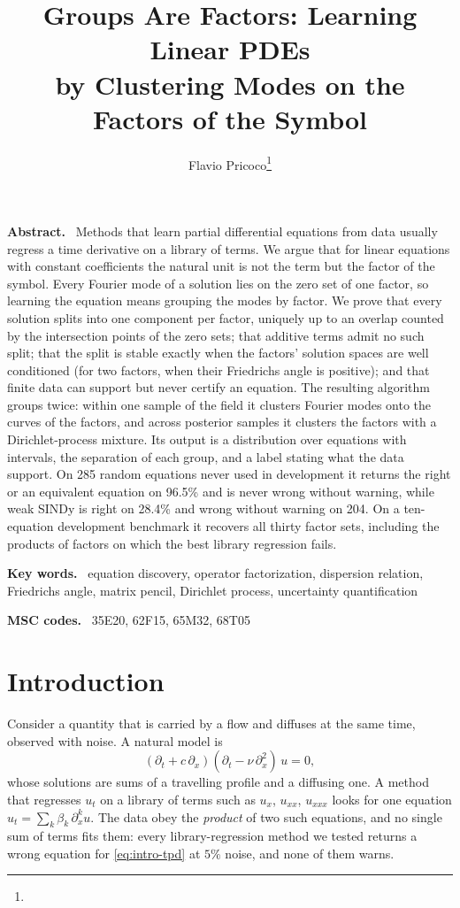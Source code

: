 \documentclass[11pt]{article}
\title{Groups Are Factors: Learning Linear PDEs\\by Clustering Modes on the Factors of the Symbol}
\author{Flavio Pricoco\thanks{\email{flaflapr@gmail.com}}}
\newenvironment{keywords}{\par\smallskip\noindent\textbf{Key words.}\ }{\par}
\newenvironment{MSCcodes}{\par\smallskip\noindent\textbf{MSC codes.}\ }{\par}
\renewenvironment{abstract}{\par\small\noindent\textbf{Abstract.}\ }{\par\normalsize}
\theoremstyle{plain}
\theoremstyle{definition}
\theoremstyle{remark}
\begin{document}
\maketitle

\begin{abstract}
Methods that learn partial differential equations from data usually regress a time derivative on a library of terms.
We argue that for linear equations with constant coefficients the natural unit is not the term but the factor of the
symbol. Every Fourier mode of a solution lies on the zero set of one factor, so learning the equation means grouping
the modes by factor. We prove that every solution splits into one component per factor, uniquely up to an overlap
counted by the intersection points of the zero sets; that additive terms admit no such split; that the split is stable
exactly when the factors' solution spaces are well conditioned (for two factors, when their Friedrichs angle is
positive); and that finite data can support but never certify an equation. The resulting algorithm groups twice:
within one sample of the field it clusters Fourier modes onto the curves of the factors, and across posterior samples
it clusters the factors with a Dirichlet-process mixture. Its output is a distribution over equations with intervals,
the separation of each group, and a label stating what the data support. On 285 random equations never used in
development it returns the right or an equivalent equation on 96.5\% and is never wrong without warning, while weak
SINDy is right on 28.4\% and wrong without warning on 204. On a ten-equation development benchmark it recovers all
thirty factor sets, including the products of factors on which the best library regression fails.
\end{abstract}

\begin{keywords}
equation discovery, operator factorization, dispersion relation, Friedrichs angle, matrix pencil, Dirichlet process,
uncertainty quantification
\end{keywords}

\begin{MSCcodes}
35E20, 62F15, 65M32, 68T05
\end{MSCcodes}

\section{Introduction}\label{sec:intro}
Consider a quantity that is carried by a flow and diffuses at the same time, observed with noise. A natural model is
\begin{equation}\label{eq:intro-tpd}
  (\partial_t+c\,\partial_x)(\partial_t-\nu\,\partial_x^2)\,u=0,
\end{equation}
whose solutions are sums of a travelling profile and a diffusing one. A method that regresses $u_t$ on a library of
terms such as $u_x$, $u_{xx}$, $u_{xxx}$ looks for one equation $u_t=\sum_k\beta_k\,\partial_x^ku$. The data obey the
\emph{product} of two such equations, and no single sum of terms fits them: every library-regression method we tested
returns a wrong equation for \eqref{eq:intro-tpd} at $5\%$ noise, and none of them warns.
\end{document}
